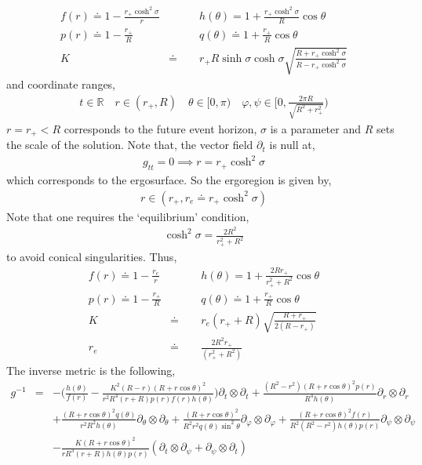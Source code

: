 \documentclass[11pt]{article}
\renewcommand{\phi}{\varphi}
\begin{document}
 \begin{eqnarray}
 f(r)\doteq1-\frac{r_+\cosh^2\sigma}{r}&\qquad& h(\theta)=1+\frac{r_+\cosh^2\sigma}{R}\cos\theta\\
 p(r)\doteq1-\frac{r_+}{R}&\qquad& q(\theta)\doteq1+\frac{r_+}{R}\cos\theta\\
 K&\doteq&r_+R\sinh\sigma\cosh\sigma\sqrt{\frac{R+r_+\cosh^2\sigma}{R-r_+\cosh^2\sigma}}
 \end{eqnarray}
 and coordinate ranges, 
 \begin{eqnarray}
 t\in \mathbb{R}\quad r\in (r_+,R)\quad \theta\in [0,\pi)\quad \phi,\psi\in \Big[0,\frac{2\pi R}{\sqrt{R^2+r_+^2}}\Big)
 \end{eqnarray}
 $r=r_+<R$ corresponds to the future event horizon, $\sigma$ is a parameter and $R$ sets the scale of the solution. Note that, the vector field $\partial_t$ is null at,
 \begin{eqnarray}
 g_{tt}=0\implies r=r_+\cosh^2\sigma
 \end{eqnarray}
 which corresponds to the ergosurface. So the ergoregion is given by, 
 \begin{eqnarray}
 r\in (r_+,r_e\doteq r_+\cosh^2\sigma)
 \end{eqnarray}
 Note that one requires the `equilibrium' condition, 
 \begin{eqnarray}
 \cosh^2\sigma=\frac{2R^2}{r_+^2+R^2}
 \end{eqnarray}
 to avoid conical singularities. Thus, 
 \begin{eqnarray}
 f(r)\doteq1-\frac{r_e}{r}&\qquad& h(\theta)=1+\frac{2Rr_+}{r_+^2+R^2}\cos\theta\\
 p(r)\doteq1-\frac{r_+}{R}&\qquad& q(\theta)\doteq1+\frac{r_+}{R}\cos\theta\\
 K&\doteq&r_e(r_++R)\sqrt{\frac{R+r_+}{2(R-r_+)}}\\
 r_e&\doteq&\frac{2R^2r_+}{(r_+^2+R^2)}
 \end{eqnarray}
 The inverse metric is the following, 
 \begin{eqnarray}
 g^{-1}&=&-\Big(\frac{h(\theta)}{f(r)}-\frac{K^2(R-r)(R+r\cos\theta)^2}{r^2R^4(r+R)p(r)f(r)h(\theta)}\Big)\partial_t\otimes\partial_t+\frac{(R^2-r^2)(R+r\cos\theta)^2p(r)}{R^4h(\theta)}\partial_r\otimes\partial_r\\
 &&+\frac{(R+r\cos\theta)^2q(\theta)}{r^2R^2h(\theta)}\partial_{\theta}\otimes\partial_{\theta}+\frac{(R+r\cos\theta)^2}{R^2r^2q(\theta)\sin^2\theta}\partial_{\phi}\otimes\partial_{\phi}+\frac{(R+r\cos\theta)^2f(r)}{R^2(R^2-r^2)h(\theta)p(r)}\partial_{\psi}\otimes\partial_{\psi}\nonumber\\
 &&-\frac{K(R+r\cos\theta)^2}{rR^3(r+R)h(\theta)p(r)}(\partial_{t}\otimes\partial_{\psi}+\partial_{\psi}\otimes\partial_t)\nonumber
 \end{eqnarray}
\end{document}
